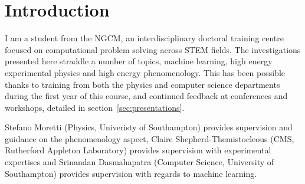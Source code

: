 \section{Introduction}

I am a student from the NGCM,
an interdisciplinary doctoral training centre focused on 
computational problem solving across STEM fields.
The investigations presented here straddle a number of topics, machine learning, high energy experimental physics and high energy phenomenology. 
This has been possible thanks to training
from both the physics and computer science departments
during the first year of this course,
and continued feedback at conferences and workshops, detailed in section~\ref{sec:presentations}.

Stefano Moretti (Physics, Univeristy of Southampton) provides supervision and guidance on the phenomenology aspect,
Claire Shepherd-Themistocleous (CMS, Rutherford Appleton Laboratory) provides supervision with experimental expertises and
Srinandan Dasmahapatra (Computer Science, University of Southampton) provides supervision with regards to machine learning.



